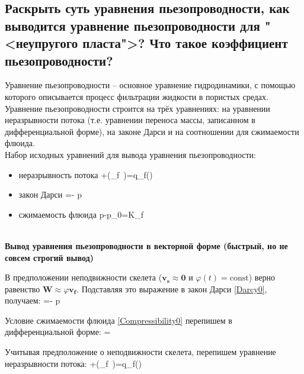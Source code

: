 

\subsection{Раскрыть суть уравнения пьезопроводности, как выводится уравнение пьезопроводности для "<неупругого пласта">? Что такое коэффициент пьезопроводности?}

Уравнение пьезопроводности -- основное уравнение гидродинамики, с помощью которого описывается процесс фильтрации жидкости в пористых средах.
\\

Уравнение пьезопроводности строится на трёх уравнениях: на уравнении неразрывности потока (т.е. уравнении переноса массы, записанном в дифференциальной форме), на законе Дарси и на соотношении для сжимаемости флюида.
\\

Набор исходных уравнений для вывода уравнения пьезопроводности:
\begin{itemize}
	\item неразрывность потока
	\beq\label{Continuity0}
	+\pmb{\nabla}\cdot\left(\rho_f\varphi \, \right)=q_f()
	\eeq
	\item закон Дарси
	\beq\label{Darcy0}
	=-\cdot\pmb{\nabla} p
	\eeq
	\item сжимаемость флюида
	\beq\label{Compressibility0}
	p-p_0=K_f
	\eeq
\end{itemize}
\ \\

\textbf{Вывод уравнения пьезопроводности в векторной форме (быстрый, но не совсем строгий вывод)}

В предположении неподвижности скелета ($\pmb{v_s}\approx \pmb{0}$ и $\varphi(t)=\textrm{const}$) верно равенство $\pmb{W}\approx\varphi \pmb{v_f}$.
Подставляя это выражение в закон Дарси \eqref{Darcy0}, получаем:
\beq\label{DarcyWithSkeletNotMoving0}
\varphi {}=-\cdot\pmb{\nabla} p
\eeq

Условие сжимаемости флюида \eqref{Compressibility0} перепишем в дифференциальной форме:
\beq\label{CompressibilityDiff0}
=
\eeq

Учитывая предположение о неподвижности скелета, перепишем уравнение неразрывности потока:
\beq\label{ContinuityWithSkeletNotMoving0}
\varphi{}+\pmb{\nabla}\cdot\left(\rho_f\varphi \, \right)=q_f()
\eeq

